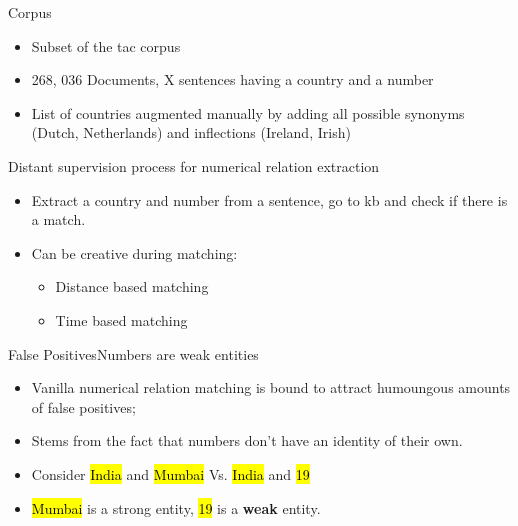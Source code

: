 \documentclass{beamer}
\makeatletter
\newcommand\SoulColor{%
  \let\set@color\beamerorig@set@color
  \let\reset@color\beamerorig@reset@color}
\makeatother
\begin{document}
\begin{frame}{Corpus}
\begin{itemize}
 \item Subset of the tac corpus
 \item 268, 036 Documents, X sentences having a country and a number 
 \item List of countries augmented manually by adding all possible synonyms (Dutch, Netherlands) and inflections (Ireland, Irish)
\end{itemize}

 
\end{frame}

\begin{frame}{Distant supervision process for numerical relation extraction}
 \begin{itemize}
  \item Extract a country and number from a sentence, go to kb and check if there is a match.
  \item Can be creative during matching:
  \begin{itemize}
   \item Distance based matching
   \item Time based matching
  \end{itemize}
 \end{itemize}
\end{frame}

\begin{frame}{False Positives}{Numbers are weak entities}
\begin{itemize}
 \item Vanilla numerical relation matching is bound to attract humoungous amounts of false positives;
 \item Stems from the fact that numbers don't have an identity of their own.
 \item Consider {\SoulColor\hl{India}} and {\SoulColor\hl{Mumbai}} Vs. {\SoulColor\hl{India}} and {\SoulColor\hl{19}}
 \item {\SoulColor\hl{Mumbai}} is a strong entity, {\SoulColor\hl{19}} is a \textbf{weak} entity.
 \end{itemize}
\end{frame}
\end{document}
